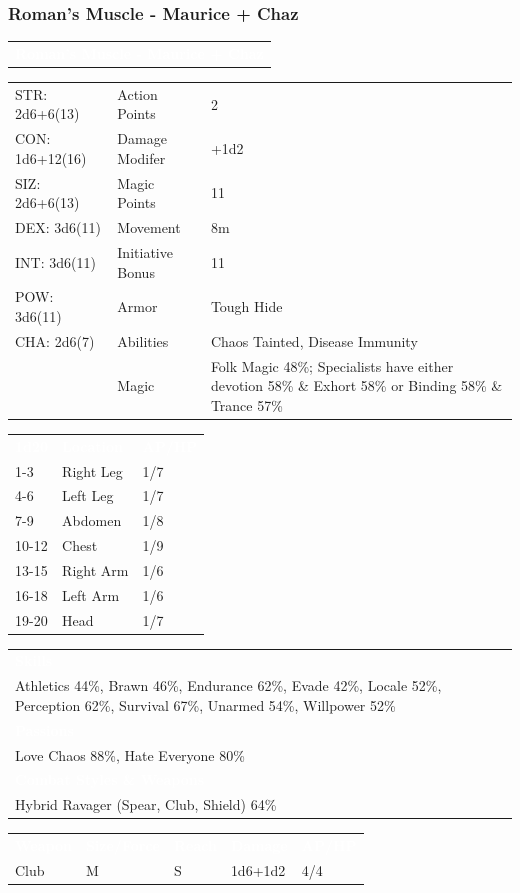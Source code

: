 \documentclass[letterpaper,serif]{rpg-module}
\begin{document}
\subsubsection{Roman's Muscle - Maurice + Chaz}

\lipsum[1]

\vspace{12pt}

\noindent\begin{tabularx}{\linewidth}{X}
\rowcolor{gray}
\textcolor{white}{\textbf{Roman's Muscle - Maurice + Chaz }}
\end{tabularx}
\begin{tabularx}{\linewidth}{XXX}
STR: 2d6+6(13) & Action Points & 2 \\
CON: 1d6+12(16) & Damage Modifer & +1d2 \\
SIZ: 2d6+6(13) & Magic Points & 11 \\
DEX: 3d6(11) & Movement & 8m \\
INT: 3d6(11) & Initiative Bonus & 11 \\
POW: 3d6(11) & Armor & Tough Hide \\
CHA: 2d6(7) & Abilities & Chaos Tainted, Disease Immunity \\
    & Magic & Folk Magic 48\%; Specialists have either devotion 58\% \& Exhort 58\% or Binding 58\% \& Trance 57\%
\end{tabularx}
\begin{tabularx}{\linewidth}{XXX}
\rowcolor{gray}
\textcolor{white}{\textbf{1d20}} & \textcolor{white}{\textbf{Location}} & \textcolor{white}{\textbf{AP/HP}} \\
1-3 & Right Leg & 1/7 \\
4-6 & Left Leg & 1/7 \\
7-9 & Abdomen & 1/8 \\
10-12 & Chest & 1/9 \\
13-15 & Right Arm & 1/6 \\
16-18 & Left Arm & 1/6 \\
19-20 & Head & 1/7 
\end{tabularx}
\begin{tabularx}{\linewidth}{X}
\rowcolor{gray}
\textcolor{white}{\textbf{Skills}} \\
Athletics 44\%, Brawn 46\%, Endurance 62\%, Evade 42\%, Locale 52\%, Perception 62\%, Survival 67\%, Unarmed 54\%, Willpower 52\%\\
\rowcolor{gray}
\textcolor{white}{\textbf{Passions}} \\
Love Chaos 88\%, Hate Everyone 80\% \\
\rowcolor{gray}
\textcolor{white}{\textbf{Combat Styles \& Weapons}} \\
Hybrid Ravager (Spear, Club, Shield) 64\%
\end{tabularx}
\begin{tabularx}{\linewidth}{XXXXX}
\rowcolor{gray}
\textcolor{white}{\textbf{Weapon}} & \textcolor{white}{\textbf{Size/Force}} & \textcolor{white}{\textbf{Reach}} & \textcolor{white}{\textbf{Damage}} & \textcolor{white}{\textbf{AP/HP}} \\
Club & M & S & 1d6+1d2 & 4/4
\end{tabularx}
\end{document}
